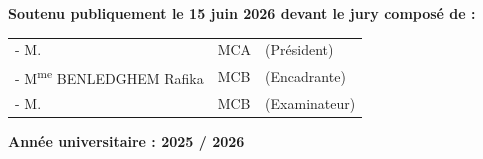\begin{titlepage}
\vfill

\begin{minipage}{0.9\textwidth}\centering
\fontsize{10}{12}\selectfont
\textbf{Soutenu publiquement le 15 juin 2026 devant le jury composé de :}\\[0.2cm]
\begin{tabular}{lll}
- M. \dotfill & MCA & (Président) \\
- M\textsuperscript{me} BENLEDGHEM Rafika & MCB & (Encadrante) \\
- M. \dotfill & MCB & (Examinateur) \\
\end{tabular}
\end{minipage}

\vfill

{\large\textbf{Année universitaire : 2025 / 2026}}

\end{titlepage}
